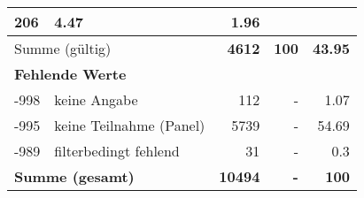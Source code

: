 \begin{longtable}{lXrrr}
       \num{206} &
       \num[round-mode=places,round-precision=2]{4,47} &
         \num[round-mode=places,round-precision=2]{1,96} \\
     \midrule
     \multicolumn{2}{l}{Summe (gültig)} &
       \textbf{\num{4612}} &
     \textbf{100} &
       \textbf{\num[round-mode=places,round-precision=2]{43,95}} \\
     \multicolumn{5}{l}{\textbf{Fehlende Werte}}\\
       -998 &
       keine Angabe &
         \num{112} &
        - &
         \num[round-mode=places,round-precision=2]{1,07} \\
       -995 &
       keine Teilnahme (Panel) &
         \num{5739} &
        - &
         \num[round-mode=places,round-precision=2]{54,69} \\
       -989 &
       filterbedingt fehlend &
         \num{31} &
        - &
         \num[round-mode=places,round-precision=2]{0,3} \\
     \midrule
     \multicolumn{2}{l}{\textbf{Summe (gesamt)}} &
          \textbf{\num{10494}} &
        \textbf{-} &
        \textbf{100} \\
     \bottomrule
     \end{longtable}
     
